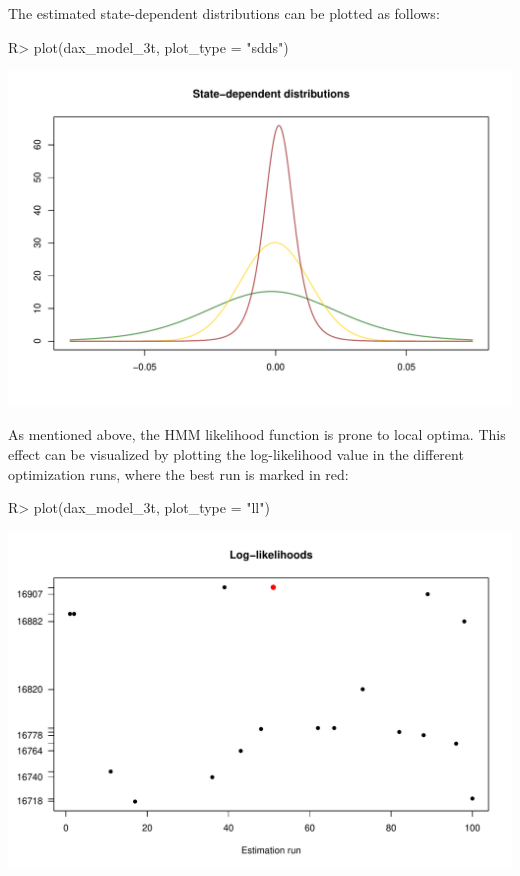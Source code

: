 \documentclass[article]{jss}
\begin{document}
The estimated state-dependent distributions can be plotted as follows:

%
\begin{Schunk}
\begin{Sinput}
R> plot(dax_model_3t, plot_type = "sdds")
\end{Sinput}
\end{Schunk}
\includegraphics{fhmm_oelschlaeger_adam_michels-sdds}
%

As mentioned above, the HMM likelihood function is prone to local optima. This effect can be visualized by plotting the log-likelihood value in the different optimization runs, where the best run is marked in red:

%
\begin{Schunk}
\begin{Sinput}
R> plot(dax_model_3t, plot_type = "ll")
\end{Sinput}
\end{Schunk}
\includegraphics{fhmm_oelschlaeger_adam_michels-ll}
%
\end{document}
